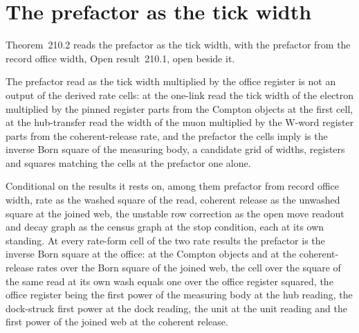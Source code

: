 \section{The prefactor as the tick width}\label{mod:IX-3-prefactor-as-the-tick-width}
\label{narr:open:9-3}Theorem~210.2 reads the prefactor as the tick width, with the prefactor from the record office width, Open result~210.1, open beside it.
\begin{chwall}\label{box:IX-3-prefactor-as-the-tick-width:1}
The prefactor read as the tick width multiplied by the office register is not an output of the derived rate cells: at the one-link read the tick width of the electron multiplied by the pinned register parts from the Compton objects at the first cell, at the hub-transfer read the width of the muon multiplied by the W-word register parts from the coherent-release rate, and the prefactor the cells imply is the inverse Born square of the measuring body, a candidate grid of widths, registers and squares matching the cells at the prefactor one alone.
\end{chwall}
\begin{chconditional}\label{box:IX-3-prefactor-as-the-tick-width:2}
Conditional on the results it rests on, among them prefactor from record office width, rate as the washed square of the read, coherent release as the unwashed square at the joined web, the unstable row correction as the open move readout and decay graph as the census graph at the stop condition, each at its own standing. At every rate-form cell of the two rate results the prefactor is the inverse Born square at the office: at the Compton objects and at the coherent-release rates over the Born square of the joined web, the cell over the square of the same read at its own wash equals one over the office register squared, the office register being the first power of the measuring body at the hub reading, the dock-struck first power at the dock reading, the unit at the unit reading and the first power of the joined web at the coherent release.
\end{chconditional}
